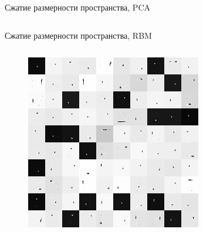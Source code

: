 \documentclass[10pt]{beamer}
\begin{document}
\begin{frame}{Сжатие размерности пространства, PCA}
\begin{columns}
\end{columns}

\end{frame}

\begin{frame}{Сжатие размерности пространства, RBM}

\begin{columns}
	
	\begin{figure}[h!]
		\centering
  		\includegraphics[width=1\textwidth]{images/rbm1.png}
	\end{figure} 
    
	

\end{columns}
\end{frame}
\end{document}
